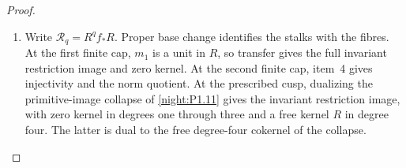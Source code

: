 \documentclass[11pt,a4paper]{article}
\numberwithin{equation}{section}
\theoremstyle{definition}
\begin{document}
\begin{proof}
\begin{enumerate}[label=\arabic*.]
of \cite[Lemma~7.25 and Propositions~7.26--7.27, pp.~61--63]{AC26}
and \cite[\S7, pp.~17--21]{E26}, with the
following explicitly computed coefficients.  Put
$L_q=\bigwedge^qR^6$, $A_q=\bigwedge^qA$, $B_q=\bigwedge^qB$.
The based-sphere complex for $j_*L_q$ is
\[
\begin{gathered}
 J_{1,q}\oplus J_{2,q}\oplus J_{0,q}
 \xrightarrow{d_0} L_q^2\xrightarrow{\Delta_q}L_q,\\
 J_{1,q}=\ker(A_q-I),\quad J_{2,q}=\ker(B_q-I),\quad
 J_{0,q}=\ker(B_qA_q-I),\\
 d_0(j_1,j_2,j_0)=(j_1-j_0,j_2-A_qj_0),\\
 \Delta_q(x,y)=(A_q-I)x+(B_q-I)y.
\end{gathered}
\]
The cusp paths carry $j_0$ and $A_qj_0$, so their combined
boundary is zero.  Inverse generator conventions give a chain
isomorphism: use cusp basis $A_qJ_{0,q}$ for the inverse pair,
and maps $-I$, $\operatorname{diag}(-A_q,-B_q)$, $I$ in degrees
zero, one and two.  Both chain identities follow by multiplication.

Unimodular HNF transformations give primitive invariant bases
and kernel coordinates for $d_0$ in $\ker\Delta_q$.  In both cases
the exact Smith records are
\[
\begin{array}{c|ccc|c|c}
q&\operatorname{rank}H^0&\operatorname{rank}H^1&\operatorname{rank}H^2
 &\operatorname{SNF}(d_0\text{ in }\ker\Delta_q)
 &\operatorname{SNF}(\Delta_q)\\\hline
1&1&0&0&1^6&1^5,2\\
2&0&0&0&1^{15}&1^{14},2\\
3&0&3&0&1^{17}&1^{19},2\\
4&0&0&0&1^{15}&1^{14},2
\end{array}
\]
All displayed groups are therefore free over $R$.

\item Write $\mathcal R_q=R^qf_*R$.  Proper base change
\cite[Tag~09V5, Lemma~20.18.1; chapter PDF p.~30]{StacksProject} identifies the stalks
with the fibres.  At the first finite cap, $m_1$ is a
unit in $R$, so transfer gives the full invariant restriction
image and zero kernel.  At the second finite cap, item~4 gives
injectivity and the norm quotient.  At the prescribed cusp,
dualizing the primitive-image collapse of
\cref{night:P1.11} gives the invariant restriction image, with
zero kernel in degrees one through three and a free kernel $R$
in degree four.  The latter is dual to the free degree-four
cokernel of the collapse.


\end{enumerate}
\end{proof}
\end{document}
